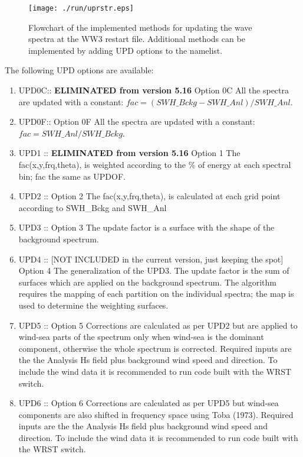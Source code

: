 \begin{figure} \begin{center}
\texttt{[image: ./run/uprstr.eps]}
\caption{Flowchart of the implemented methods for updating the wave spectra at the WW3 
restart file. Additional methods can be implemented by adding UPD options to the namelist.}
\label{fig:uprstrflowchart} \botline
\end{center}
\end{figure}

The following UPD options are available:
\begin{enumerate} 
   \item UPD0C:: \textbf{ELIMINATED from version 5.16} Option 0C  All the spectra are 
   updated with a constant: \newline
      \(fac=(SWH\_Bckg-SWH\_Anl)/SWH\_Anl \).
   \item UPD0F:: Option 0F  All the spectra are updated with a constant: \newline 
      \(fac=SWH\_Anl/SWH\_Bckg \).
   \item UPD1 ::  \textbf{ELIMINATED from version 5.16} Option 1  The fac(x,y,frq,theta), 
   is weighted according to the \% of energy at each spectral bin; fac the same as UPDOF.
   \item UPD2 :: Option 2   The fac(x,y,frq,theta), is calculated at each grid point 
   according to SWH\_Bckg and SWH\_Anl
   \item UPD3 :: Option 3   The update factor is a surface with the shape of 
   the background spectrum. 
   \item UPD4 :: [NOT INCLUDED in the current version, just keeping the spot]
   Option 4  The generalization of the UPD3. The update factor is the sum of surfaces 
   which are applied on the background spectrum. The algorithm requires the mapping 
   of each partition on the individual spectra; the map is used to determine the weighting 
   surfaces.
   \item UPD5 :: Option 5   Corrections are calculated as per UPD2 but are
   applied to wind-sea parts of the spectrum only when wind-sea
   is the dominant component, otherwise the whole spectrum is
   corrected. Required inputs are the the Analysis Hs field plus 
   background wind speed and direction. To include the wind data it is recommended
   to run code built with the WRST switch.
   \item UPD6 :: Option 6   Corrections are calculated as per UPD5 but wind-sea
   components are also shifted in frequency space using Toba (1973).
   Required inputs are the the Analysis Hs field plus background wind speed and direction.
   To include the wind data it is recommended to run code built with the WRST switch.
\end{enumerate}

